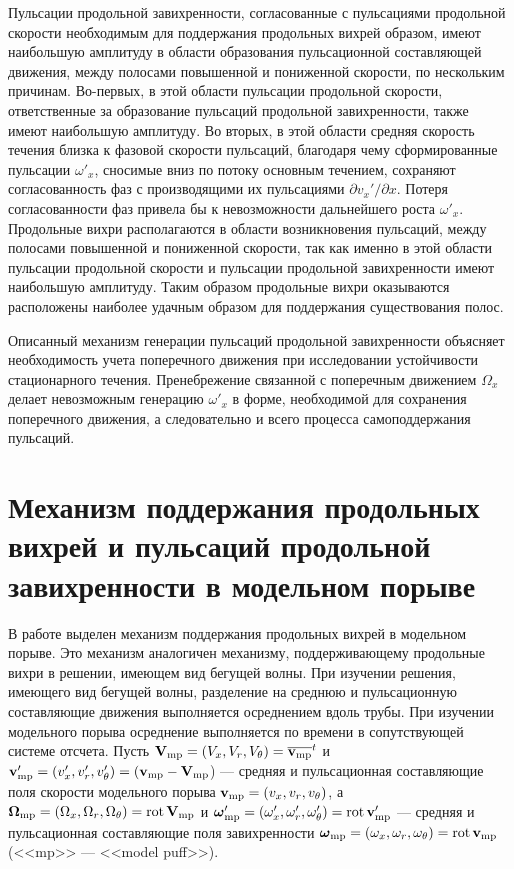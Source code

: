 Пульсации продольной завихренности, согласованные с пульсациями продольной скорости необходимым для поддержания продольных вихрей образом, имеют наибольшую амплитуду в области образования пульсационной составляющей движения, между полосами повышенной и пониженной скорости, по нескольким причинам. Во-первых, в этой области пульсации продольной скорости, ответственные за образование пульсаций продольной завихренности, также имеют наибольшую амплитуду. Во вторых, в этой области средняя скорость течения близка к фазовой скорости пульсаций, благодаря чему сформированные пульсации $\omega'_x$, сносимые вниз по потоку основным течением, сохраняют согласованность фаз с производящими их пульсациями $\partial v_x'/\partial x$. Потеря согласованности фаз привела бы к невозможности дальнейшего роста $\omega'_x$. Продольные вихри располагаются в области возникновения пульсаций, между полосами повышенной и пониженной скорости, так как именно в этой области пульсации продольной скорости и пульсации продольной завихренности имеют наибольшую амплитуду. Таким образом продольные вихри оказываются расположены наиболее удачным образом для поддержания существования полос. 

Описанный механизм генерации пульсаций продольной завихренности объясняет необходимость учета поперечного движения при исследовании устойчивости стационарного течения. Пренебрежение связанной с поперечным движением $\Omega_x$ делает невозможным генерацию $\omega'_x$ в форме, необходимой для сохранения поперечного движения, а следовательно и всего процесса самоподдержания пульсаций.


\section{Механизм поддержания продольных вихрей и пульсаций продольной завихренности в модельном порыве} \label{edge_oxgen}

В работе выделен механизм поддержания продольных вихрей в модельном порыве. Это механизм аналогичен механизму, поддерживающему продольные вихри в решении, имеющем вид бегущей волны. При изучении решения, имеющего вид бегущей волны, разделение на среднюю и пульсационную составляющие движения выполняется осреднением вдоль трубы. При изучении модельного порыва осреднение выполняется по времени в сопутствующей системе отсчета. Пусть $\mathbf{V}_\mathrm{mp} = (V_x, V_r, V_\theta) = \overline{\mathbf{v}_\mathrm{mp}}^t$ и $\mathbf{v}'_\mathrm{mp} = (v'_x, v'_r, v'_\theta) = (\mathbf{v}_\mathrm{mp} - \mathbf{V}_\mathrm{mp}$) --- средняя и пульсационная составляющие поля скорости модельного порыва $\mathbf{v}_\mathrm{mp} = (v_x, v_r, v_\theta)$, а $\mbox{\boldmath$\Omega$}_\mathrm{mp} = (\Omega_x, \Omega_r, \Omega_\theta) = \mathop{}\!\operatorname{rot} \mathbf{V}_\mathrm{mp}$ и $\mbox{\boldmath$\omega$}'_\mathrm{mp} = (\omega'_x, \omega'_r, \omega'_\theta) = \mathop{}\!\operatorname{rot} \mathbf{v}'_\mathrm{mp}$ --- средняя и пульсационная составляющие поля завихренности $\mbox{\boldmath$\omega$}_\mathrm{mp} = (\omega_x, \omega_r, \omega_\theta) = \mathop{}\!\operatorname{rot} \mathbf{v}_\mathrm{mp}$ (<<mp>> --- <<model puff>>). 


